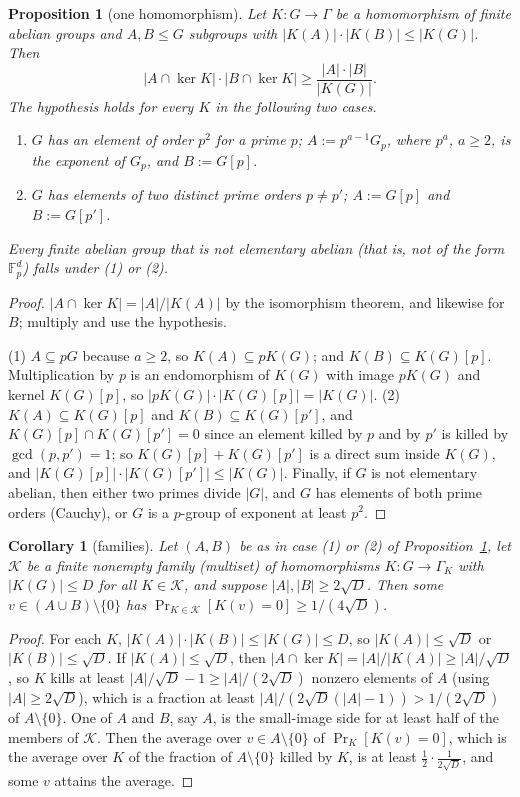 \documentclass[11pt]{article}
\newtheorem{corollary}[theorem]{Corollary}
\newtheorem{proposition}[theorem]{Proposition}
\theoremstyle{definition}
\theoremstyle{remark}
\newcommand{\Fp}{\mathbb{F}_p}
\begin{document}
\begin{proposition}[one homomorphism]\label{g:prop:C}
Let $K\colon G\to\Gamma$ be a homomorphism of finite abelian groups and $A,B\le G$ subgroups with $|K(A)|\cdot|K(B)|\le|K(G)|$. Then
\[
|A\cap\ker K|\cdot|B\cap\ker K|\ge\frac{|A|\cdot|B|}{|K(G)|}.
\]
The hypothesis holds for every $K$ in the following two cases.
\begin{enumerate}[label=\textup{(\arabic*)}]
\item $G$ has an element of order $p^2$ for a prime $p$; $A:=p^{a-1}G_p$, where $p^a$, $a\ge2$, is the exponent of $G_p$, and $B:=G[p]$.
\item $G$ has elements of two distinct prime orders $p\ne p'$; $A:=G[p]$ and $B:=G[p']$.
\end{enumerate}
Every finite abelian group that is not elementary abelian (that is, not of the form $\Fp^d$) falls under (1) or (2).
\end{proposition}

\begin{proof}
$|A\cap\ker K|=|A|/|K(A)|$ by the isomorphism theorem, and likewise for $B$; multiply and use the hypothesis.

(1) $A\subseteq pG$ because $a\ge2$, so $K(A)\subseteq pK(G)$; and $K(B)\subseteq K(G)[p]$. Multiplication by $p$ is an endomorphism of $K(G)$ with image $pK(G)$ and kernel $K(G)[p]$, so $|pK(G)|\cdot|K(G)[p]|=|K(G)|$. (2) $K(A)\subseteq K(G)[p]$ and $K(B)\subseteq K(G)[p']$, and $K(G)[p]\cap K(G)[p']=0$ since an element killed by $p$ and by $p'$ is killed by $\gcd(p,p')=1$; so $K(G)[p]+K(G)[p']$ is a direct sum inside $K(G)$, and $|K(G)[p]|\cdot|K(G)[p']|\le|K(G)|$. Finally, if $G$ is not elementary abelian, then either two primes divide $|G|$, and $G$ has elements of both prime orders (Cauchy), or $G$ is a $p$-group of exponent at least $p^2$.
\end{proof}

\begin{corollary}[families]\label{g:cor:C}
Let $(A,B)$ be as in case (1) or (2) of Proposition~\ref{g:prop:C}, let $\mathcal K$ be a finite nonempty family (multiset) of homomorphisms $K\colon G\to\Gamma_K$ with $|K(G)|\le D$ for all $K\in\mathcal K$, and suppose $|A|,|B|\ge2\sqrt D$. Then some $v\in(A\cup B)\setminus\{0\}$ has $\Pr_{K\in\mathcal K}[K(v)=0]\ge1/(4\sqrt D)$.
\end{corollary}
\begin{proof}
For each $K$, $|K(A)|\cdot|K(B)|\le|K(G)|\le D$, so $|K(A)|\le\sqrt D$ or $|K(B)|\le\sqrt D$. If $|K(A)|\le\sqrt D$, then $|A\cap\ker K|=|A|/|K(A)|\ge|A|/\sqrt D$, so $K$ kills at least $|A|/\sqrt D-1\ge|A|/(2\sqrt D)$ nonzero elements of $A$ (using $|A|\ge2\sqrt D$), which is a fraction at least $|A|/(2\sqrt D(|A|-1))>1/(2\sqrt D)$ of $A\setminus\{0\}$. One of $A$ and $B$, say $A$, is the small-image side for at least half of the members of $\mathcal K$. Then the average over $v\in A\setminus\{0\}$ of $\Pr_K[K(v)=0]$, which is the average over $K$ of the fraction of $A\setminus\{0\}$ killed by $K$, is at least $\frac12\cdot\frac1{2\sqrt D}$, and some $v$ attains the average.
\end{proof}
\end{document}
